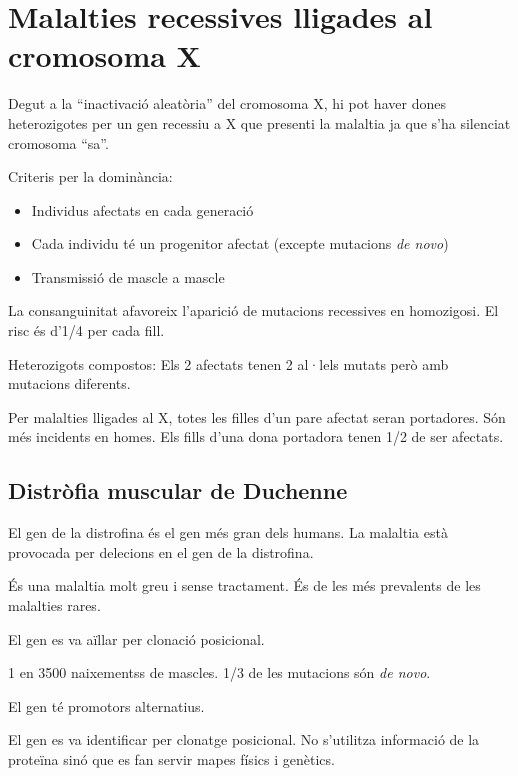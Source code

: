 \section{Malalties recessives lligades al cromosoma X}
\label{sec:malalt-llig-al}

Degut a la ``inactivació aleatòria'' del cromosoma X, hi pot haver dones
heterozigotes per un gen recessiu a X que presenti la malaltia ja que
s'ha silenciat cromosoma ``sa''.

Criteris per la dominància:
\begin{itemize}
\item Individus afectats en cada generació
\item Cada individu té un progenitor afectat (excepte mutacions
  \textit{de novo})
\item Transmissió de mascle a mascle
\end{itemize}

La consanguinitat afavoreix l'aparició de mutacions recessives en
homozigosi. El risc és d'1/4 per cada fill.

Heterozigots compostos: Els 2 afectats tenen 2 al·lels mutats però amb
mutacions diferents.

Per malalties lligades al X, totes les filles d'un pare afectat seran
portadores. Són més incidents en homes. Els fills d'una dona portadora
tenen 1/2 de ser afectats.

\subsection{Distròfia muscular de Duchenne}
\label{sec:distr-musc-de}
El gen de la distrofina és el gen més gran dels humans. La malaltia
està provocada per delecions en el gen de la distrofina.

És una malaltia molt greu i sense tractament. És de les més prevalents
de les malalties rares.

El gen es va aïllar per clonació posicional.


1 en 3500 naixementss de mascles. 1/3 de les mutacions són \textit{de
  novo}.

El gen té promotors alternatius.

El gen es va identificar per clonatge posicional. No s'utilitza
informació de la proteïna sinó que es fan servir mapes físics i
genètics.

